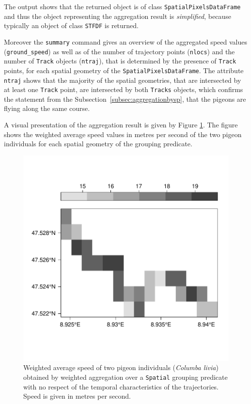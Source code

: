 \documentclass[12pt, oneside, a4paper]{scrbook}
\let\code=\texttt
\begin{document}
The output shows that the returned object is of class \code{SpatialPixelsDataFrame} and thus the object representing the aggregation result is \textit{simplified}, because typically an object of class \code{STFDF} is returned.
\par\medskip

Moreover the \code{summary} command gives an overview of the aggregated speed values (\code{ground\_speed}) as well as of the number of trajectory points (\code{nlocs}) and the number of \code{Track} objects (\code{ntraj}), that is determined by the presence of \code{Track} points, for each spatial geometry of the \code{SpatialPixelsDataFrame}. 
The attribute \code{ntraj} shows that the majority of the spatial geometries, that are intersected by at least one \code{Track} point, are intersected by both \code{Tracks} objects, which confirms the statement from the Subsection~\ref{subsec:aggregationbysp}, that the pigeons are flying along the same course.
\par\medskip

A visual presentation of the aggregation result is given by Figure \ref{fig:aggoverspaceigntime}. The figure shows the weighted average speed values in metres per second of the two pigeon individuals for each spatial geometry of the grouping predicate.
\par\medskip

\begin{figure}[!htb]
\centering
\includegraphics{trajagg-agg_stf_pureSpatial_fig_1}
\caption[Weighted average speed of two pigeons obtained by aggregation over a \code{Spatial} grouping predicate with no respect of time]{Weighted average speed of two pigeon individuals (\textit{Columba livia}) obtained by weighted aggregation over a \code{Spatial} grouping predicate with no respect of the temporal characteristics of the trajectories. Speed is given in metres per second.}
\label{fig:aggoverspaceigntime}
\end{figure}
\end{document}
